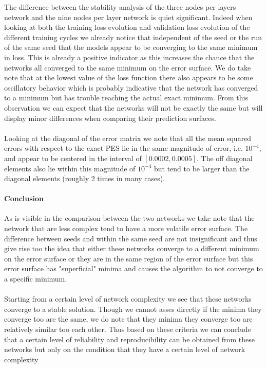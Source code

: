 \documentclass[]{article}
\begin{document}
The difference between the stability analysis of the three nodes per layers network and the nine nodes per layer network is quiet significant. Indeed when looking at both the training loss evolution and validation loss evolution of the different training cycles we already notice that independent of the seed or the run of the same seed that the models appear to be converging to the same minimum in loss. This is already a positive indicator as this increases the chance that the networks all converged to the same minimum on the error surface. We do take note that at the lowest value of the loss function there also appears to be some oscillatory behavior which is probably indicative that the network has converged to a minimum but has trouble reaching the actual exact minimum. From this observation we can expect that the networks will not be exactly the same but will display minor differences when comparing their prediction surfaces.
\\
\\
Looking at the diagonal of the error matrix we note that all the mean squared errors with respect to the exact PES lie in the same magnitude of error, i.e. $10^{-4}$, and appear to be centered in the interval of $\left[0.0002, 0.0005\right]$. The off diagonal elements also lie within this magnitude of $10^{-4}$ but tend to be larger than the diagonal elements (roughly 2 times in many cases). 

\paragraph{Conclusion}

As is visible in the comparison between the two networks we take note that the network that are less complex tend to have a more volatile error surface. The difference between seeds and within the same seed are not insignificant and thus give rise too the idea that either these networks converge to a different minimum on the error surface or they are in the same region of the error surface but this error surface has "superficial" minima and causes the algorithm to not converge to a specific minimum.
\\
\\
Starting from a certain level of network complexity we see that these networks converge to a stable solution. Though we cannot asses directly if the minima they converge too are the same, we do note that they minima they converge too are relatively similar too each other. Thus based on these criteria we can conclude that a certain level of reliability and reproducibility can be obtained from these networks but only on the condition that they have a certain level of network complexity 
\end{document}
